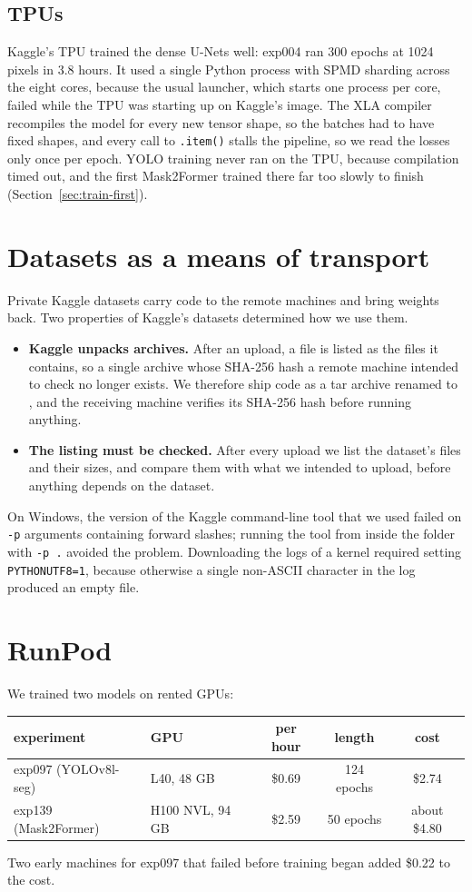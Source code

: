 \subsection{TPUs}\label{sec:infra-tpu}
Kaggle's TPU trained the dense U-Nets well: exp004 ran 300 epochs at 1024 pixels in 3.8 hours. It used
a single Python process with SPMD sharding across the eight cores, because the usual launcher, which
starts one process per core, failed while the TPU was starting up on Kaggle's image. The XLA compiler
recompiles the model for every new tensor shape, so the batches had to have fixed shapes, and every
call to \texttt{.item()} stalls the pipeline, so we read the losses only once per epoch. YOLO training
never ran on the TPU, because compilation timed out, and the first Mask2Former trained there far too
slowly to finish (Section~\ref{sec:train-first}).

\section{Datasets as a means of transport}\label{sec:infra-datasets}
Private Kaggle datasets carry code to the remote machines and bring weights back. Two properties of
Kaggle's datasets determined how we use them.
\begin{itemize}[leftmargin=*,itemsep=2pt]
\item \textbf{Kaggle unpacks archives.} After an upload, a  file is listed as the files
it contains, so a single archive whose SHA-256 hash a remote machine intended to check no longer
exists. We therefore ship code as a tar archive renamed to , and the receiving machine
verifies its SHA-256 hash before running anything.
\item \textbf{The listing must be checked.} After every upload we list the dataset's files and their
sizes, and compare them with what we intended to upload, before anything depends on the dataset.
\end{itemize}
On Windows, the version of the Kaggle command-line tool that we used failed on \texttt{-p} arguments
containing forward slashes; running the tool from inside the folder with \texttt{-p .} avoided the
problem. Downloading the logs of a kernel required setting \texttt{PYTHONUTF8=1}, because otherwise a
single non-ASCII character in the log produced an empty file.

\section{RunPod}\label{sec:infra-runpod}
We trained two models on rented GPUs:
\begin{center}\small
\begin{tabular}{@{}llccc@{}}
\toprule
experiment & GPU & per hour & length & cost \\
\midrule
exp097 (YOLOv8l-seg) & L40, 48 GB & \$0.69 & 124 epochs & \$2.74 \\
exp139 (Mask2Former) & H100 NVL, 94 GB & \$2.59 & 50 epochs & about \$4.80 \\
\bottomrule
\end{tabular}
\end{center}
Two early machines for exp097 that failed before training began added \$0.22 to the cost.

